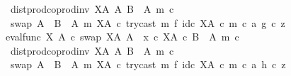 \begin{isabellebody}
\ \ \ \ \ \ \ \ \ \ \ \ dist{\isacharunderscore}{\kern0pt}prod{\isacharunderscore}{\kern0pt}coprod{\isacharunderscore}{\kern0pt}inv\ {\isacharparenleft}{\kern0pt}X\isactrlbsup A\isactrlesup {\isacharparenright}{\kern0pt}\ A\ {\isacharparenleft}{\kern0pt}B\ {\isasymsetminus}\ {\isacharparenleft}{\kern0pt}A{\isacharcomma}{\kern0pt}\ m{\isacharparenright}{\kern0pt}{\isacharparenright}{\kern0pt}\ {\isasymcirc}\isactrlsub c\isanewline
\ \ \ \ \ \ \ \ \ \ \ \ swap\ {\isacharparenleft}{\kern0pt}A\ {\isasymCoprod}\ {\isacharparenleft}{\kern0pt}B\ {\isasymsetminus}\ {\isacharparenleft}{\kern0pt}A{\isacharcomma}{\kern0pt}\ m{\isacharparenright}{\kern0pt}{\isacharparenright}{\kern0pt}{\isacharparenright}{\kern0pt}\ {\isacharparenleft}{\kern0pt}X\isactrlbsup A\isactrlesup {\isacharparenright}{\kern0pt}\ {\isasymcirc}\isactrlsub c\ try{\isacharunderscore}{\kern0pt}cast\ m\ {\isasymtimes}\isactrlsub f\ id\isactrlsub c\ {\isacharparenleft}{\kern0pt}X\isactrlbsup A\isactrlesup {\isacharparenright}{\kern0pt}{\isacharparenright}{\kern0pt}\ {\isasymcirc}\isactrlsub c\ {\isasymlangle}m\ {\isasymcirc}\isactrlsub c\ a{\isacharcomma}{\kern0pt}\ g\ {\isasymcirc}\isactrlsub c\ z{\isasymrangle}\isanewline
\ \ \ \ \ \ \ \ \ \ {\isacharequal}{\kern0pt}\ {\isacharparenleft}{\kern0pt}{\isacharparenleft}{\kern0pt}eval{\isacharunderscore}{\kern0pt}func\ X\ A\ {\isasymcirc}\isactrlsub c\ swap\ {\isacharparenleft}{\kern0pt}X\isactrlbsup A\isactrlesup {\isacharparenright}{\kern0pt}\ A{\isacharparenright}{\kern0pt}\ {\isasymamalg}\ {\isacharparenleft}{\kern0pt}x\ {\isasymcirc}\isactrlsub c\ {\isasymbeta}\isactrlbsub X\isactrlbsup A\isactrlesup \ {\isasymtimes}\isactrlsub c\ {\isacharparenleft}{\kern0pt}B\ {\isasymsetminus}\ {\isacharparenleft}{\kern0pt}A{\isacharcomma}{\kern0pt}\ m{\isacharparenright}{\kern0pt}{\isacharparenright}{\kern0pt}\isactrlesub {\isacharparenright}{\kern0pt}\ {\isasymcirc}\isactrlsub c\isanewline
\ \ \ \ \ \ \ \ \ \ \ \ dist{\isacharunderscore}{\kern0pt}prod{\isacharunderscore}{\kern0pt}coprod{\isacharunderscore}{\kern0pt}inv\ {\isacharparenleft}{\kern0pt}X\isactrlbsup A\isactrlesup {\isacharparenright}{\kern0pt}\ A\ {\isacharparenleft}{\kern0pt}B\ {\isasymsetminus}\ {\isacharparenleft}{\kern0pt}A{\isacharcomma}{\kern0pt}\ m{\isacharparenright}{\kern0pt}{\isacharparenright}{\kern0pt}\ {\isasymcirc}\isactrlsub c\isanewline
\ \ \ \ \ \ \ \ \ \ \ \ swap\ {\isacharparenleft}{\kern0pt}A\ {\isasymCoprod}\ {\isacharparenleft}{\kern0pt}B\ {\isasymsetminus}\ {\isacharparenleft}{\kern0pt}A{\isacharcomma}{\kern0pt}\ m{\isacharparenright}{\kern0pt}{\isacharparenright}{\kern0pt}{\isacharparenright}{\kern0pt}\ {\isacharparenleft}{\kern0pt}X\isactrlbsup A\isactrlesup {\isacharparenright}{\kern0pt}\ {\isasymcirc}\isactrlsub c\ try{\isacharunderscore}{\kern0pt}cast\ m\ {\isasymtimes}\isactrlsub f\ id\isactrlsub c\ {\isacharparenleft}{\kern0pt}X\isactrlbsup A\isactrlesup {\isacharparenright}{\kern0pt}{\isacharparenright}{\kern0pt}\ {\isasymcirc}\isactrlsub c\ {\isasymlangle}m\ {\isasymcirc}\isactrlsub c\ a{\isacharcomma}{\kern0pt}\ h\ {\isasymcirc}\isactrlsub c\ z{\isasymrangle}{\isachardoublequoteclose}\isanewline

\end{isabellebody}
